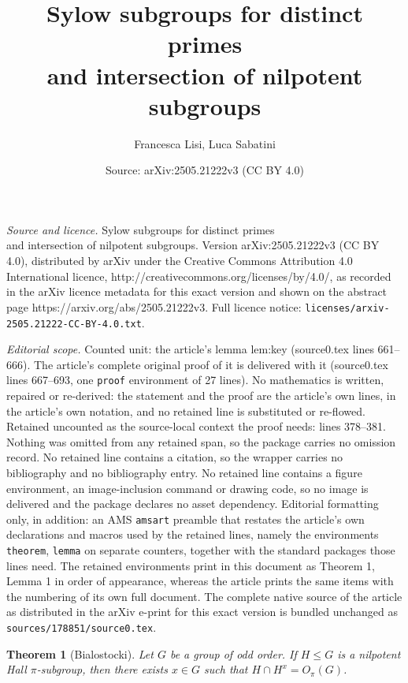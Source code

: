 \documentclass[10pt,a4paper]{amsart}
\title{Sylow subgroups for distinct primes\\and intersection of nilpotent subgroups}
\author{Francesca Lisi, Luca Sabatini}
\date{Source: arXiv:2505.21222v3 (CC BY 4.0)}
\newtheorem{theorem}{Theorem}
\begin{document}
\maketitle

\noindent\emph{Source and licence.} Sylow subgroups for distinct primes\\and intersection of nilpotent subgroups. Version arXiv:2505.21222v3 (CC BY 4.0), distributed by arXiv under the Creative Commons Attribution 4.0 International licence, http://creativecommons.org/licenses/by/4.0/, as recorded in the arXiv licence metadata for this exact version and shown on the abstract page https://arxiv.org/abs/2505.21222v3. Full licence notice: \texttt{licenses/arxiv-2505.21222-CC-BY-4.0.txt}.\par\smallskip

\noindent\textit{Editorial scope.} Counted unit: the article's lemma lem:key (source0.tex lines 661--666). The article's complete original proof of it is delivered with it (source0.tex lines 667--693, one \texttt{proof} environment of 27 lines). No mathematics is written, repaired or re-derived: the statement and the proof are the article's own lines, in the article's own notation, and no retained line is substituted or re-flowed.  Retained uncounted as the source-local context the proof needs: lines 378--381.  Nothing was omitted from any retained span, so the package carries no omission record.  No retained line contains a citation, so the wrapper carries no bibliography and no bibliography entry.  No retained line contains a figure environment, an image-inclusion command or drawing code, so no image is delivered and the package declares no asset dependency.  Editorial formatting only, in addition: an AMS \texttt{amsart} preamble that restates the article's own declarations and macros used by the retained lines, namely the environments \texttt{theorem}, \texttt{lemma} on separate counters, together with the standard packages those lines need.  The retained environments print in this document as Theorem 1, Lemma 1 in order of appearance, whereas the article prints the same items with the numbering of its own full document.  The complete native source of the article as distributed in the arXiv e-print for this exact version is bundled unchanged as \texttt{sources/178851/source0.tex}.
\begin{theorem}[Bialostocki] \label{thBialoHall}
Let $G$ be a group of odd order.
If $H \leqslant G$ is a nilpotent Hall $\pi$-subgroup, then there exists $x \in G$ such that $H \cap H^x = O_\pi(G)$.
\end{theorem}
\end{document}
